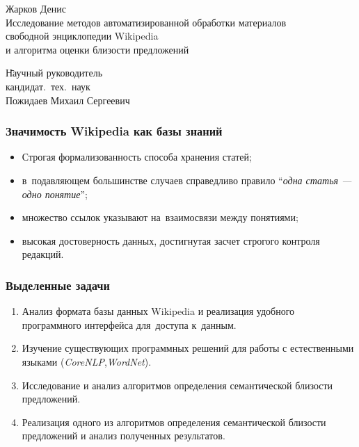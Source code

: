 \documentclass{beamer}
\begin{document}
\sloppy

\begin{frame}
\begin{center}
Жарков Денис\\
\vspace{1cm}
{\Large Исследование методов автоматизированной обработки материалов \\ 
свободной энциклопедии Wikipedia\\
и алгоритма оценки близости предложений}
\end{center}
\begin{tabbing}
\hspace{6.5cm} \= Научный руководитель\\
\> кандидат.~тех.~наук\\
\> Пожидаев Михаил Сергеевич\\
\end{tabbing}
\end{frame}

\begin{frame}
\frametitle{Значимость Wikipedia как базы знаний}

\begin{itemize}
\item{
Строгая формализованность способа хранения статей;
}
\item{
в~подавляющем большинстве случаев справедливо
правило ``\textit{одна статья --- одно понятие}'';
}
\item{
множество ссылок указывают на~взаимосвязи между понятиями;
}
\item{
высокая достоверность данных, достигнутая засчет строгого контроля редакций.
}
\end{itemize}
\end{frame}

\begin{frame}
\frametitle{Выделенные задачи}
\begin{enumerate}
\item {
Анализ формата базы данных Wikipedia и реализация удобного программного интерфейса 
для~доступа к~данным.
}
\item {
Изучение существующих программных решений для работы с естественными языками (\textit{CoreNLP},\textit{WordNet}).
}
\item {
Исследование и анализ алгоритмов определения семантической близости предложений.
}
\item{
Реализация одного из алгоритмов определения семантической близости предложений и
анализ полученных результатов.
}
\end{enumerate}
\end{frame}
\end{document}
